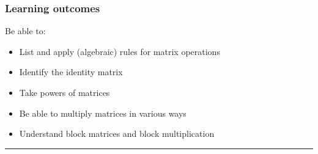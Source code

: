  





\subsubsection*{Learning outcomes}
Be able to:
\begin{itemize}
	 \item List and apply (algebraic) rules for matrix operations
	 \item Identify the identity matrix
	 \item Take powers of matrices
	 \item Be able to multiply matrices in various ways
	 \item Understand block matrices and block multiplication

	
\end{itemize}





\rule[0.01in]{\textwidth}{0.0025in}


%
%
